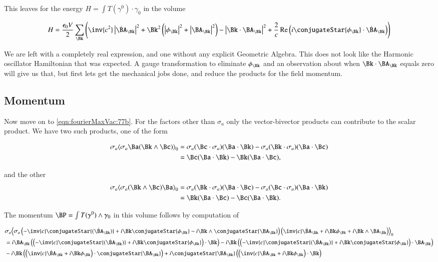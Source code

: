This leaves for the energy $H = \int T(\gamma^0) \cdot \gamma_0$ in the volume

\begin{align}\label{eqn:fourierMaxVac:80}
H = 
\frac{\epsilon_0 V}{2} \sum_\Bk \left(
\inv{c^2} \Abs{\dot{\BA}_\Bk}^2 
+\Bk^2 \left( \Abs{\phi_\Bk}^2 + \Abs{\BA_\Bk}^2 \right) - \Abs{\Bk \cdot \BA_\Bk}^2
+ \frac{2}{c} \Real \left( i \conjugateStar{\phi_\Bk} \cdot \dot{\BA}_\Bk \right)
\right)
\end{align}

We are left with a completely real expression, and one without any explicit Geometric Algebra.  This does not look like the Harmonic oscillator Hamiltonian that was expected.  A gauge transformation to eliminate $\phi_\Bk$ and an observation about when $\Bk \cdot \BA_\Bk$ equals zero will give us that, but first lets get the mechanical jobs done, and reduce the products for the field momentum.

\subsection{Momentum}

Now move on to \autoref{eqn:fourierMaxVac:77b}.  For the factors other than $\sigma_a$ only the vector-bivector products can contribute to the scalar product.  We have two such products, one of the form

\begin{align*}
\sigma_a \gpgradezero{ \sigma_a \Ba (\Bk \wedge \Bc) }
&=
\sigma_a (\Bc \cdot \sigma_a) (\Ba \cdot \Bk) - \sigma_a (\Bk \cdot \sigma_a) (\Ba \cdot \Bc) \\
&=
\Bc (\Ba \cdot \Bk) - \Bk (\Ba \cdot \Bc),
\end{align*}

and the other
\begin{align*}
\sigma_a \gpgradezero{ \sigma_a (\Bk \wedge \Bc) \Ba }
&=
\sigma_a (\Bk \cdot \sigma_a) (\Ba \cdot \Bc) - \sigma_a (\Bc \cdot \sigma_a) (\Ba \cdot \Bk) \\
&=
\Bk (\Ba \cdot \Bc) - \Bc (\Ba \cdot \Bk).
\end{align*}

The momentum $\BP = \int T(\gamma^0) \wedge \gamma_0$ in this volume follows by computation of

\begin{align*}
&\sigma_a \gpgradezero{ \sigma_a
\left( -\inv{c} \conjugateStar{(\dot{\BA}_{\Bk})} + i \Bk \conjugateStar{\phi_{\Bk}} - i \Bk \wedge \conjugateStar{\BA_{\Bk}} \right) 
\left( \inv{c} \dot{\BA}_\Bk + i \Bk \phi_\Bk + i \Bk \wedge \BA_\Bk \right) 
} \\
&=
  i \BA_\Bk \left( \left( -\inv{c} \conjugateStar{(\dot{\BA}_{\Bk})} + i \Bk \conjugateStar{\phi_{\Bk}} \right) \cdot \Bk \right)  
- i \Bk \left( \left( -\inv{c} \conjugateStar{(\dot{\BA}_{\Bk})} + i \Bk \conjugateStar{\phi_{\Bk}} \right) \cdot \BA_\Bk \right)  \\
&- i \Bk \left( \left( \inv{c} \dot{\BA}_\Bk + i \Bk \phi_\Bk \right) \cdot \conjugateStar{\BA_\Bk} \right)  
+ i \conjugateStar{\BA_{\Bk}} \left( \left( \inv{c} \dot{\BA}_\Bk + i \Bk \phi_\Bk \right) \cdot \Bk \right)
\end{align*}


